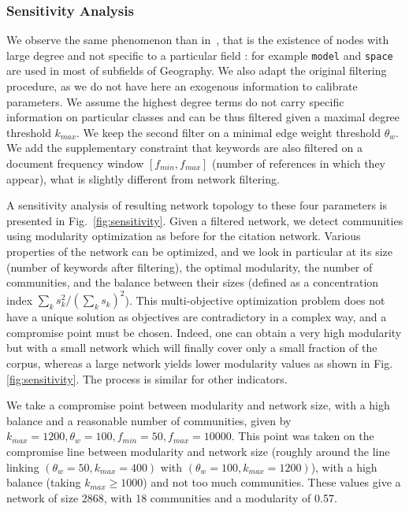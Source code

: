 \subsubsection*{Sensitivity Analysis}

We observe the same phenomenon than in~\cite{bergeaud2017classifying}, that is the existence of nodes with large degree and not specific to a particular field : for example \texttt{model} and \texttt{space} are used in most of subfields of Geography. We also adapt the original filtering procedure, as we do not have here an exogenous information to calibrate parameters. We assume the highest degree terms do not carry specific information on particular classes and can be thus filtered given a maximal degree threshold $k_{max}$. We keep the second filter on a minimal edge weight threshold $\theta_w$. We add the supplementary constraint that keywords are also filtered on a document frequency window $\left[ f_{min},f_{max} \right]$ (number of references in which they appear), what is slightly different from network filtering.

A sensitivity analysis of resulting network topology to these four parameters is presented in Fig.~\ref{fig:sensitivity}. Given a filtered network, we detect communities using modularity optimization as before for the citation network. Various properties of the network can be optimized, and we look in particular at its size (number of keywords after filtering), the optimal modularity, the number of communities, and the balance between their sizes (defined as a concentration index $\sum_k s_k^2 / (\sum_k s_k)^2$). This multi-objective optimization problem does not have a unique solution as objectives are contradictory in a complex way, and a compromise point must be chosen. Indeed, one can obtain a very high modularity but with a small network which will finally cover only a small fraction of the corpus, whereas a large network yields lower modularity values as shown in Fig.\ref{fig:sensitivity}. The process is similar for other indicators.

We take a compromise point between modularity and network size, with a high balance and a reasonable number of communities, given by $k_{max} = 1200, \theta_w = 100, f_{min} = 50, f_{max} = 10000$. This point was taken on the compromise line between modularity and network size (roughly around the line linking $(\theta_w=50,k_{max}=400)$ with $(\theta_w=100,k_{max}=1200)$), with a high balance (taking $k_{max}\geq 1000$) and not too much communities. These values give a network of size 2868, with 18 communities and a modularity of 0.57.


